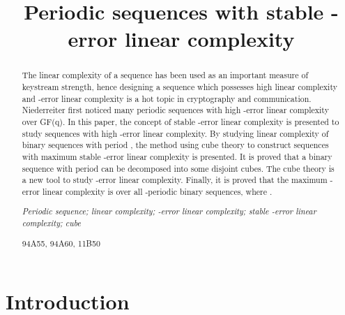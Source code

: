 \documentclass[10pt,conference,twocolumn]{IEEEtran}
\begin{document}
\pagestyle{headings}  \vspace{1cm}

\title{Periodic sequences with stable -error linear complexity}


\author{
}
\maketitle              
\begin{abstract}
The linear complexity of a sequence has been used as an important
measure of keystream strength, hence designing a sequence which
possesses high linear complexity and -error linear complexity is
a hot topic in cryptography and communication. Niederreiter first
noticed many periodic sequences with high -error linear
complexity over GF(q). In this paper, the concept of stable
-error linear complexity is presented to study sequences with
high -error linear complexity. By studying linear complexity of
binary sequences with period , the method using cube theory to
construct sequences with maximum stable -error linear complexity
is presented.  It is  proved that a binary sequence with period
 can be decomposed into some disjoint cubes. The cube theory is
a new tool to  study -error linear complexity. Finally, it is
proved that the maximum  -error linear complexity is
 over all -periodic binary sequences, where
.

 {\it Periodic sequence; linear complexity;
-error linear complexity; stable -error linear complexity;
cube}

 94A55, 94A60, 11B50
\end{abstract}

\section{Introduction}
\end{document}
